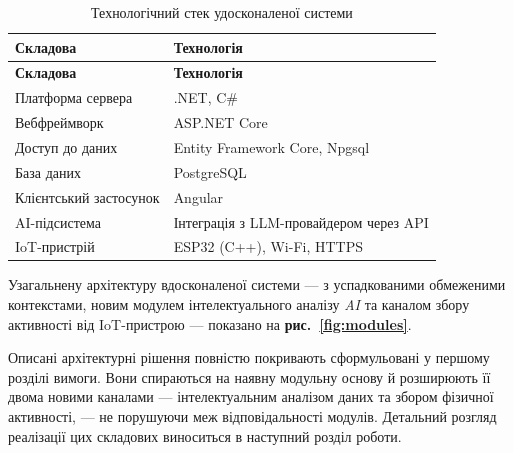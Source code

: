 \begin{center}
    \begin{xltabular}{\textwidth}{| >{\raggedright\arraybackslash}X | >{\raggedright\arraybackslash}X |}
        \caption{Технологічний стек удосконаленої системи} \label{tab:stack} \\
        \hline
        \textbf{Складова} & \textbf{Технологія} \\ \hline
        \endfirsthead

        \hline
        \textbf{Складова} & \textbf{Технологія} \\ \hline
        \endhead

        Платформа сервера & .NET, C\# \\ \hline
        Вебфреймворк & ASP.NET Core \\ \hline
        Доступ до даних & Entity Framework Core, Npgsql \\ \hline
        База даних & PostgreSQL \\ \hline
        Клієнтський застосунок & Angular \\ \hline
        AI-підсистема & Інтеграція з LLM-провайдером через API \\ \hline
        IoT-пристрій & ESP32 (C++), Wi-Fi, HTTPS \\ \hline
    \end{xltabular}
\end{center}

Узагальнену архітектуру вдосконаленої системи — з успадкованими обмеженими контекстами, новим
модулем інтелектуального аналізу \textit{AI} та каналом збору активності від IoT-пристрою —
показано на \textbf{рис.~\ref{fig:modules}}.


Описані архітектурні рішення повністю покривають сформульовані у першому розділі вимоги.
Вони спираються на наявну модульну основу й розширюють її двома новими каналами — інтелектуальним
аналізом даних та збором фізичної активності, — не порушуючи меж відповідальності модулів.
Детальний розгляд реалізації цих складових виноситься в наступний розділ роботи.

